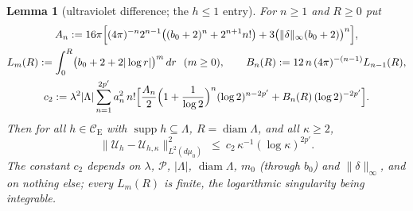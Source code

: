 \documentclass[11pt,a4paper]{article}
\theoremstyle{plain}
\newtheorem{lemma}[theorem]{Lemma}
\theoremstyle{definition}
\theoremstyle{plain}
\theoremstyle{definition}
\newcommand{\CE}{\mathcal{C}_{\mathrm E}}
\DeclareMathOperator{\supp}{supp}
\begin{document}
\begin{lemma}[ultraviolet difference; the $h\le1$ entry]\label{lem:uv}
For $n\ge1$ and $R\ge0$ put
\begin{gather*}
 A_n:=16\pi\Bigl[(4\pi)^{-n}2^{n-1}\bigl((b_0+2)^n+2^{n+1}n!\bigr)+3\bigl(\|\delta\|_\infty
 (b_0+2)\bigr)^n\Bigr],\\
 L_m(R):=\int_0^R\bigl(b_0+2+2|\log r|\bigr)^m\,dr\ \ (m\ge0),\qquad
 B_n(R):=12\,n\,(4\pi)^{-(n-1)}L_{n-1}(R),\\
 c_2:=\lambda^2|\Lambda|\sum_{n=1}^{2p'}a_n^2\,n!\Bigl[\frac{A_n}2\Bigl(1+\frac1{\log2}\Bigr)^n
 (\log2)^{n-2p'}+B_n(R)\,(\log2)^{-2p'}\Bigr] .
\end{gather*}
Then for all $h\in\CE$ with $\supp h\subseteq\Lambda$, $R=\operatorname{diam}\Lambda$, and all
$\kappa\ge2$,
\[
  \bigl\|\mathcal U_h-\mathcal U_{h,\kappa}\bigr\|_{L^2(d\mu_0)}^2
  \ \le\ c_2\,\kappa^{-1}(\log\kappa)^{2p'} .
\]
The constant $c_2$ depends on $\lambda$, $\mathscr P$, $|\Lambda|$, $\operatorname{diam}
\Lambda$, $m_0$ (through $b_0$) and $\|\delta\|_\infty$, and on nothing else; every
$L_m(R)$ is finite, the logarithmic singularity being integrable.
\end{lemma}
\end{document}
